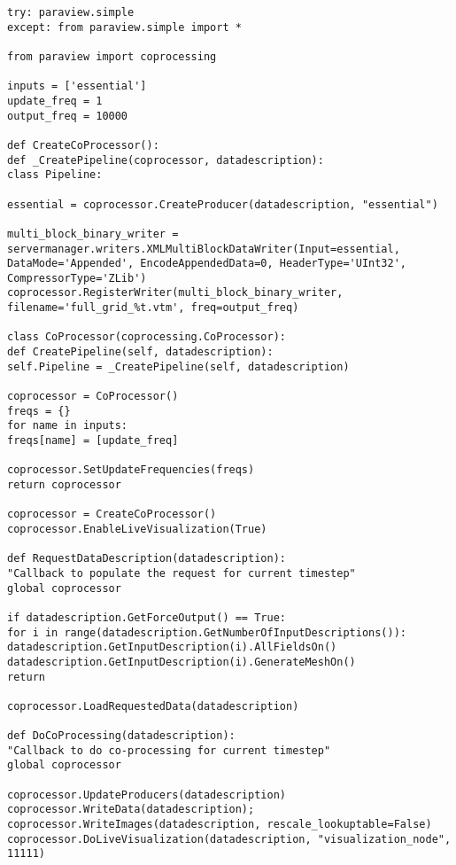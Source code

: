 \begin{lstlisting}[style=CXX, caption=Sample visualization pipeline using Python script]
try: paraview.simple
except: from paraview.simple import *

from paraview import coprocessing

inputs = ['essential']
update_freq = 1
output_freq = 10000

def CreateCoProcessor():
def _CreatePipeline(coprocessor, datadescription):
class Pipeline:

essential = coprocessor.CreateProducer(datadescription, "essential")

multi_block_binary_writer = servermanager.writers.XMLMultiBlockDataWriter(Input=essential, DataMode='Appended', EncodeAppendedData=0, HeaderType='UInt32', CompressorType='ZLib')
coprocessor.RegisterWriter(multi_block_binary_writer, filename='full_grid_%t.vtm', freq=output_freq)

class CoProcessor(coprocessing.CoProcessor):
def CreatePipeline(self, datadescription):
self.Pipeline = _CreatePipeline(self, datadescription)

coprocessor = CoProcessor()
freqs = {}
for name in inputs:
freqs[name] = [update_freq]

coprocessor.SetUpdateFrequencies(freqs)
return coprocessor

coprocessor = CreateCoProcessor()
coprocessor.EnableLiveVisualization(True)

def RequestDataDescription(datadescription):
"Callback to populate the request for current timestep"
global coprocessor

if datadescription.GetForceOutput() == True:
for i in range(datadescription.GetNumberOfInputDescriptions()):
datadescription.GetInputDescription(i).AllFieldsOn()
datadescription.GetInputDescription(i).GenerateMeshOn()
return

coprocessor.LoadRequestedData(datadescription)

def DoCoProcessing(datadescription):
"Callback to do co-processing for current timestep"
global coprocessor

coprocessor.UpdateProducers(datadescription)
coprocessor.WriteData(datadescription);
coprocessor.WriteImages(datadescription, rescale_lookuptable=False)
coprocessor.DoLiveVisualization(datadescription, "visualization_node", 11111)
\end{lstlisting}

